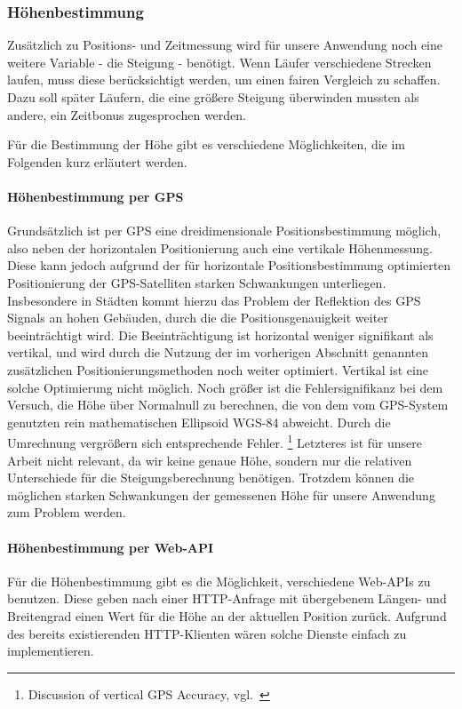 \subsubsection{Höhenbestimmung}
Zusätzlich zu Positions- und Zeitmessung wird für unsere Anwendung noch eine weitere Variable - die Steigung - benötigt. Wenn Läufer verschiedene Strecken laufen, muss diese berücksichtigt werden, um einen fairen Vergleich zu schaffen. Dazu soll später Läufern, die eine größere Steigung überwinden mussten als andere, ein Zeitbonus zugesprochen werden.

Für die Bestimmung der Höhe gibt es verschiedene Möglichkeiten, die im Folgenden kurz erläutert werden.
\paragraph{Höhenbestimmung per GPS}
Grundsätzlich ist per GPS eine dreidimensionale Positionsbestimmung möglich, also neben der horizontalen Positionierung auch eine vertikale Höhenmessung. Diese kann jedoch aufgrund der für horizontale Positionsbestimmung optimierten Positionierung der GPS-Satelliten starken Schwankungen unterliegen. Insbesondere in Städten kommt hierzu das Problem der Reflektion des GPS Signals an hohen Gebäuden, durch die die Positionsgenauigkeit weiter beeinträchtigt wird. Die Beeinträchtigung ist horizontal weniger signifikant als vertikal, und wird durch die Nutzung der im vorherigen Abschnitt genannten zusätzlichen Positionierungsmethoden noch weiter optimiert. Vertikal ist eine solche Optimierung nicht möglich. Noch größer ist die Fehlersignifikanz bei dem Versuch, die Höhe über Normalnull zu berechnen, die von dem vom GPS-System genutzten rein mathematischen Ellipsoid WGS-84 abweicht. Durch die Umrechnung vergrößern sich entsprechende Fehler. \footnote{Discussion of vertical GPS Accuracy, vgl.~\cite{gladstone}} Letzteres ist für unsere Arbeit nicht relevant, da wir keine genaue Höhe, sondern nur die relativen Unterschiede für die Steigungsberechnung benötigen. Trotzdem können die möglichen starken Schwankungen der gemessenen Höhe für unsere Anwendung zum Problem werden.
\paragraph{Höhenbestimmung per Web-API}
Für die Höhenbestimmung gibt es die Möglichkeit, verschiedene Web-APIs zu benutzen. Diese geben nach einer HTTP-Anfrage mit übergebenem Längen- und Breitengrad einen Wert für die Höhe an der aktuellen Position zurück. Aufgrund des bereits existierenden HTTP-Klienten wären solche Dienste einfach zu implementieren.

